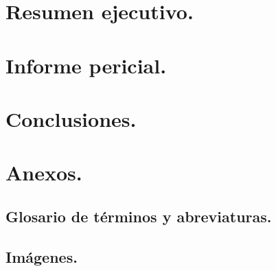 \documentclass[12pt,a4paper]{report}
\begin{document}
\chapter{Resumen ejecutivo.}

\clearpage

\chapter{Informe pericial.}

\clearpage

\chapter{Conclusiones.}

\clearpage

\chapter{Anexos.}

\clearpage

\section{Glosario de términos y abreviaturas.}

\clearpage

\section{Imágenes.}

\clearpage



\clearpage
\end{document}
